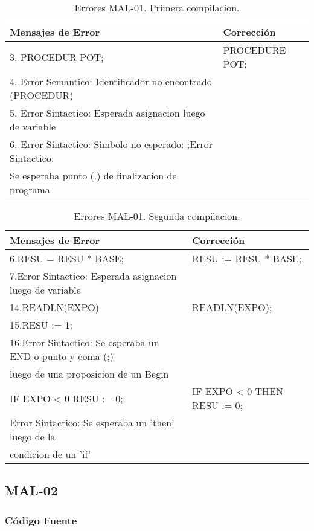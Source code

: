 \documentclass[a4paper,12pt]{article}
\begin{document}
\begin{table}[H]
\centering
\begin{tabular}{|l|l|}
\hline
Mensajes de Error & Corrección\\
\hline
3. PROCEDUR POT;												& PROCEDURE POT;\\
4. Error Semantico: Identificador no encontrado (PROCEDUR)	&\\
5. Error Sintactico: Esperada asignacion luego de variable	&\\
6. Error Sintactico: Simbolo no esperado: ;Error Sintactico: &\\
Se esperaba punto (.) de finalizacion de programa			&\\
\hline
\end{tabular}
\caption{Errores MAL-01. Primera compilacion.}
\label{MAL-01-1}
\end{table}

\begin{table}[H]
\centering
\begin{tabular}{|l|l|}
\hline
Mensajes de Error & Corrección\\
\hline
6.RESU = RESU * BASE;										& RESU := RESU * BASE;\\
7.Error Sintactico: Esperada asignacion luego de variable		&\\
\hline
14.READLN(EXPO)												& READLN(EXPO);\\
15.RESU := 1;												&\\
16.Error Sintactico: Se esperaba un END o punto y coma (;) 	&\\
luego de una proposicion de un Begin							& \\
\hline
IF EXPO < 0  RESU := 0;										& IF EXPO < 0 THEN RESU := 0;\\
Error Sintactico: Se esperaba un 'then' luego de la 			&\\
condicion de un 'if'											& \\
\hline
\end{tabular}
\caption{Errores MAL-01. Segunda compilacion.}
\label{MAL-01-2}
\end{table}

\subsection{MAL-02}
\subsubsection{Código Fuente}

\end{document}
